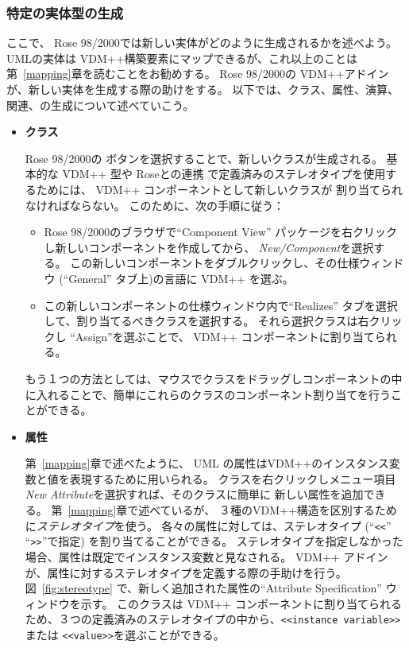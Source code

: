 \documentclass[\pformat,12pt]{jarticle}
\newcommand{\vdmpp}{VDM++}
\newcommand{\link}{Roseとの連携}
\newcommand{\rose}{Rose 98/2000}
\begin{document}
\subsubsection*{特定の実体型の生成}
  
ここで、 \rose{}では新しい実体がどのように生成されるかを述べよう。
UMLの実体は \vdmpp{}構築要素にマップできるが、これ以上のことは第~\ref{mapping}章を読むことをお勧めする。
\rose{}の \vdmpp{}アドインが、新しい実体を生成する際の助けをする。
以下では、クラス、属性、演算、関連、の生成について述べていこう。

\begin{itemize}
\item{\bf クラス} 

\rose{}の ボタンを選択することで、新しいクラスが生成される。
基本的な \vdmpp{} 型や \link{} で定義済みのステレオタイプを使用するためには、 \vdmpp{} コンポーネントとして新しいクラスが 割り当てられなければならない。
このために、次の手順に従う：

  \begin{itemize}
  \item \rose{}のブラウザで``Component  View'' パッケージを右クリックし新しいコンポーネントを作成してから、 {\em  New/Component}を選択する。
この新しいコンポーネントをダブルクリックし、その仕様ウィンドウ (``General'' タブ上)の言語に \vdmpp{} を選ぶ。
  \item この新しいコンポーネントの仕様ウィンドウ内で``Realizes'' タブを選択して、割り当てるべきクラスを選択する。
それら選択クラスは右クリックし ``Assign''を選ぶことで、 \vdmpp{} コンポーネントに割り当てられる。
  \end{itemize}

もう１つの方法としては、マウスでクラスをドラッグしコンポーネントの中に入れることで、簡単にこれらのクラスのコンポーネント割り当てを行うことができる。

\item{\bf 属性}

 第~\ref{mapping}章で述べたように、 UML の属性は\vdmpp{}のインスタンス変数と値を表現するために用いられる。
クラスを右クリックしメニュー項目{\it New Attribute}を選択すれば、そのクラスに簡単に 新しい属性を追加できる。 
 第~\ref{mapping}章で述べているが、 ３種の\vdmpp{}構造を区別するために{\it ステレオタイプ}を使う。
各々の属性に対しては、ステレオタイプ (``{\tt <<}'' ``{\tt >>}''で指定) を割り当てることができる。
ステレオタイプを指定しなかった場合、属性は既定でインスタンス変数と見なされる。
 \vdmpp{} アドインが、属性に対するステレオタイプを定義する際の手助けを行う。
図~\ref{fig:stereotype} で、新しく追加された属性の``Attribute  Specification'' ウィンドウを示す。
このクラスは \vdmpp{} コンポーネントに割り当てられるため、３つの定義済みのステレオタイプの中から、{\tt <<instance variable>>}または {\tt <<value>>}を選ぶことができる。


\end{itemize}
\end{document}
